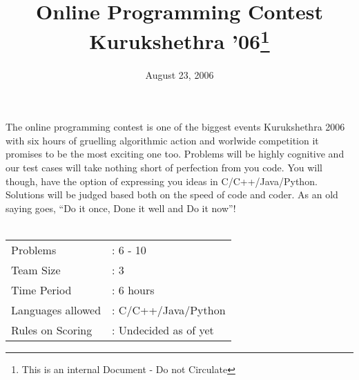 \documentclass [12pt] {article}
\begin{document}
\title{Online Programming Contest\\ Kurukshethra '06\footnote{This is an internal Document - Do not Circulate}}
\date{August 23, 2006}

\maketitle
	The online programming contest is one of the biggest events Kurukshethra 2006 with six hours of gruelling algorithmic action and worlwide competition it promises to be the most exciting one too.
	Problems will be highly cognitive and our test cases will take nothing short of perfection from you code.
	You will though, have the option of expressing you ideas in C/C++/Java/Python.
	Solutions will be judged based both on the speed of code and coder.
	As an old saying goes, ``Do it once, Done it well and Do it now''!
	\\\\
	\begin{tabular}{ll}
		Problems 		&: 6 - 10 \\
		Team Size 		&: 3\\
		Time Period 		&: 6 hours\\
		Languages allowed 	&: C/C++/Java/Python\\
		Rules on Scoring 	&: Undecided as of yet\\
	\end{tabular}
	
\end{document}

